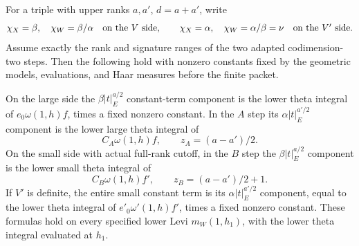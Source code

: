 \begin{srproposition}
\label{prop:sr-theta-four-constant-terms}
For a triple with upper ranks \(a,a'\), \(d=a+a'\), write
\[
 \chi_X=\beta,\quad \chi_W=\beta/\alpha
       \quad\hbox{on the \(V\) side},\qquad
 \chi_X=\alpha,\quad \chi_W=\alpha/\beta=\nu
       \quad\hbox{on the \(V'\) side}.
\]
Assume exactly the rank and signature ranges of the two adapted
codimension-two steps. Then the following hold with nonzero constants
fixed by the geometric models, evaluations, and Haar measures before
the finite packet.

On the large side the \(\beta|t|_E^{a/2}\) constant-term component is
the lower theta integral of \(e_0\omega(1,h)f\), times a fixed
nonzero constant. In the \(A\) step its
\(\alpha|t|_E^{a'/2}\) component is the lower large theta integral of
\[
       C_A\omega(1,h)f,\qquad z_A=(a-a')/2 .
 \tag{T10}\label{eq:sr-theta-large-cone-producer}
\]
On the small side with actual full-rank cutoff, in the \(B\) step
the \(\beta|t|_E^{a/2}\) component is the lower small theta integral of
\[
       C_B\omega(1,h)f',\qquad z_B=(a-a')/2+1 .
 \tag{T11}\label{eq:sr-theta-small-cone-producer}
\]
If \(V'\) is definite, the entire small constant term is its
\(\alpha|t|_E^{a'/2}\) component, equal to the lower theta integral of
\(e'_0\omega'(1,h)f'\), times a fixed nonzero constant.
These formulas hold on every specified lower Levi
\(m_W(1,h_1)\), with the lower theta integral evaluated at \(h_1\).
\end{srproposition}

